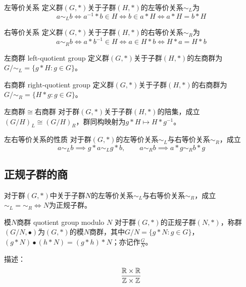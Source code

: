 \begin{definition}{左等价关系}
	定义群$(G,*)$关于子群$(H,*)$的左等价关系$\sim_L$为
	$$
	a\sim_L b \iff
	a^{-1}*b\in H \iff
	b\in a*H \iff
	a*H=b*H
	$$
\end{definition}

\begin{definition}{右等价关系}
	定义群$(G,*)$关于子群$(H,*)$的右等价关系$\sim_R$为
	$$
	a\sim_R b \iff
	a*b^{-1}\in H \iff
	a\in H*b \iff
	H*a=H*b
	$$
\end{definition}

\begin{definition}{左商群 left-quotient group}
	定义群$(G,*)$关于子群$(H,*)$的左商群为$G/\sim_L=\{ g*H:g\in G \}$。
\end{definition}

\begin{definition}{右商群 right-quotient group}
	定义群$(G,*)$关于子群$(H,*)$的右商群为$G/\sim_R=\{ H*g:g\in G \}$。
\end{definition}

\begin{proposition}{左商群$\cong$右商群}
	对于群$(G,*)$关于子群$(H,*)$的陪集，成立$(G/H)_L \cong (G/H)_R$，群同构映射为$g*H\mapsto H*g^{-1}$。
\end{proposition}

\begin{proposition}{左右等价关系的性质}
	对于群$(G,*)$的左等价关系$\sim_L$与右等价关系$\sim_R$，成立
	$$
	a\sim_L b\implies g*a\sim_L g*b,\qquad
	a\sim_R b\implies a*g\sim_R b*g
	$$
\end{proposition}

\subsection{正规子群的商}

\begin{proposition}
	对于群$(G,*)$中关于子群$N$的左等价关系$\sim_L$与右等价关系$\sim_R$，成立$\sim_L=\sim_R\iff N$为正规子群。
\end{proposition}

\begin{definition}{模$N$商群 quotient group modulo $N$}
	对于群$(G,*)$的正规子群$(N,*)$，称群$(G/N,\bullet)$为$(G,*)$的模$N$商群，其中$G/N=\{ g*N:g\in G \}$，$(g*N) \bullet (h*N)=(g*h)*N$；亦记作$\frac{G}{N}$。
\end{definition}

\begin{problem}
	描述：
	$$
	\frac{\mathbb{R}\times \mathbb{R}}{\mathbb{Z}\times\mathbb{Z}}
	$$
\end{problem}

